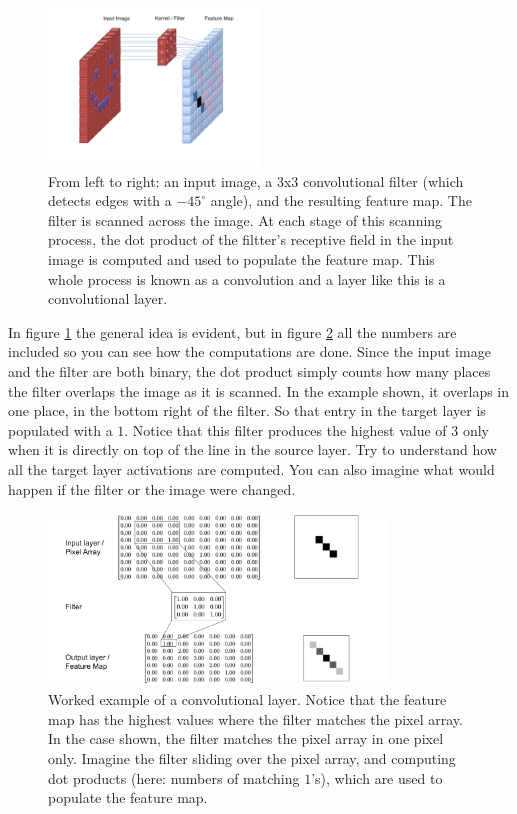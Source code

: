 \begin{figure}[h]
\centering
\includegraphics[width=0.5\textwidth]{images/CNN_Filter.png}
\caption[User Cecbur, \url{https://commons.wikimedia.org/wiki/File:Convolutional_Neural_Network_NeuralNetworkFilter.gif}, with labels added by Jeff Yoshimi.]{From left to right: an input image, a 3x3 convolutional filter (which detects edges with a $-45^\circ$ angle), and the resulting feature map. The filter is scanned across the image. At each stage of this scanning process, the dot product of the filtter's receptive field in the input image is computed and used to populate the feature map. This whole process is known as a convolution and a layer like this is a convolutional layer.}
\label{cnn_filter}
\end{figure}

In figure \ref{cnn_filter} the general idea is evident, but in figure \ref{cnn_workedExample} all the numbers are included so you can see how the computations are done. Since the input image and the filter are both binary, the dot product simply counts how many places the filter overlaps the image as it is scanned. In the example shown, it overlaps in one place, in the bottom right of the filter.  So that entry in the target layer is populated with a $1$.  Notice that this filter produces the highest value of $3$ only when it is directly on top of the line in the source layer. Try to understand how all the target layer activations are computed. You can also imagine what would happen if the filter or the image were changed.

\begin{figure}[h]
\centering
\includegraphics[width=0.8\textwidth]{images/CNN_WorkedExample.png}
\caption[Jeff Yoshimi]{Worked example of a convolutional layer. Notice that the feature map has the highest values where the filter matches the pixel array. In the case shown, the filter matches the pixel array in one pixel only. Imagine the filter sliding over the pixel array, and computing dot products (here: numbers of matching $1$'s), which are used to populate the feature map.}
\label{cnn_workedExample}
\end{figure}

